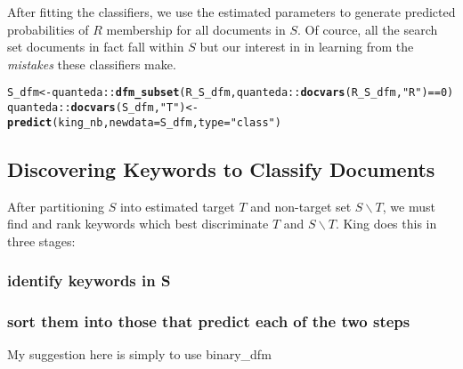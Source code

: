 \documentclass{article}\usepackage[]{graphicx}\usepackage[]{color}
\makeatletter
\newcommand{\hlnum}[1]{\textcolor[rgb]{0.686,0.059,0.569}{#1}}%
\newcommand{\hlstr}[1]{\textcolor[rgb]{0.192,0.494,0.8}{#1}}%
\newcommand{\hlopt}[1]{\textcolor[rgb]{0,0,0}{#1}}%
\newcommand{\hlstd}[1]{\textcolor[rgb]{0.345,0.345,0.345}{#1}}%
\newcommand{\hlkwb}[1]{\textcolor[rgb]{0.69,0.353,0.396}{#1}}%
\newcommand{\hlkwc}[1]{\textcolor[rgb]{0.333,0.667,0.333}{#1}}%
\newcommand{\hlkwd}[1]{\textcolor[rgb]{0.737,0.353,0.396}{\textbf{#1}}}%
\newenvironment{kframe}{%
 \def\at@end@of@kframe{}%
 \ifinner\ifhmode%
  \def\at@end@of@kframe{\end{minipage}}%
  \begin{minipage}{\columnwidth}%
 \fi\fi%
 \def\FrameCommand##1{\hskip\@totalleftmargin \hskip-\fboxsep
 \colorbox{shadecolor}{##1}\hskip-\fboxsep
     \hskip-\linewidth \hskip-\@totalleftmargin \hskip\columnwidth}%
 \MakeFramed {\advance\hsize-\width
   \@totalleftmargin\z@ \linewidth\hsize
   \@setminipage}}%
 {\par\unskip\endMakeFramed%
 \at@end@of@kframe}
\newenvironment{knitrout}{}{} %
\makeatother
\begin{document}
After fitting the classifiers, we use the estimated parameters to generate predicted probabilities of $R$ membership for all documents in $S$. Of cource, all the search set documents in fact fall within $S$ but our interest in in learning from the \textit{mistakes} these classifiers make.

\begin{knitrout}
\color{fgcolor}\begin{kframe}
\begin{alltt}
\hlstd{S_dfm} \hlkwb{<-} \hlstd{quanteda}\hlopt{::}\hlkwd{dfm_subset}\hlstd{(R_S_dfm, quanteda}\hlopt{::}\hlkwd{docvars}\hlstd{(R_S_dfm,} \hlstr{"R"}\hlstd{)}\hlopt{==}\hlnum{0}\hlstd{)}
\hlstd{quanteda}\hlopt{::}\hlkwd{docvars}\hlstd{(S_dfm,} \hlstr{"T"}\hlstd{)}\hlkwb{<-}\hlkwd{predict}\hlstd{(king_nb,} \hlkwc{newdata} \hlstd{= S_dfm,} \hlkwc{type}\hlstd{=}\hlstr{"class"}\hlstd{)}
\end{alltt}
\end{kframe}
\end{knitrout}

\subsection{Discovering Keywords to Classify Documents}
After partitioning $S$ into estimated target $T$ and non-target set $S \backslash T$, we must find and rank keywords which best discriminate $T$ and $S \backslash T$.
King does this in three stages:
\subsubsection{identify keywords in S}

\subsubsection{sort them into those that predict each of the two steps}

My suggestion here is simply to use binary\_dfm
\end{document}
